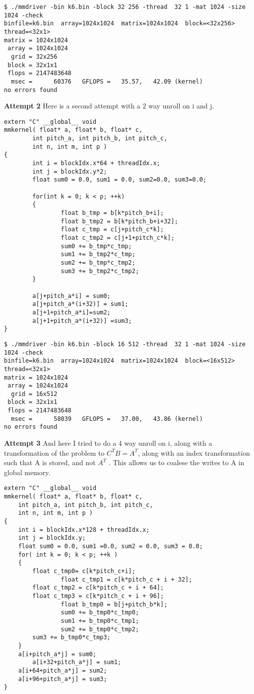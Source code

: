 \documentclass[11pt]{article}
\begin{document}
\begin{enumerate}
\begin{lstlisting}
$ ./mmdriver -bin k6.bin -block 32 256 -thread  32 1 -mat 1024 -size 1024 -check
binfile=k6.bin  array=1024x1024  matrix=1024x1024  block=<32x256>  thread=<32x1>
matrix = 1024x1024
 array = 1024x1024
  grid = 32x256
 block = 32x1x1
 flops = 2147483648
  msec =      60376   GFLOPS =   35.57,   42.09 (kernel)
no errors found
\end{lstlisting}

\textbf{Attempt 2} Here is a second attempt with a 2 way unroll on i and j.

\begin{lstlisting}
extern "C" __global__ void
mmkernel( float* a, float* b, float* c,
        int pitch_a, int pitch_b, int pitch_c,
        int n, int m, int p )
{
        int i = blockIdx.x*64 + threadIdx.x;
        int j = blockIdx.y*2;
        float sum0 = 0.0, sum1 = 0.0, sum2=0.0, sum3=0.0;

        for(int k = 0; k < p; ++k)
        {
                float b_tmp = b[k*pitch_b+i];
                float b_tmp2 = b[k*pitch_b+i+32];
                float c_tmp = c[j+pitch_c*k];
                float c_tmp2 = c[j+1+pitch_c*k];
                sum0 += b_tmp*c_tmp;
                sum1 += b_tmp2*c_tmp;
                sum2 += b_tmp*c_tmp2;
                sum3 += b_tmp2*c_tmp2;
        }

        a[j+pitch_a*i] = sum0;
        a[j+pitch_a*(i+32)] = sum1;
        a[j+1+pitch_a*i]=sum2;
        a[j+1+pitch_a*(i+32)] =sum3;
}
\end{lstlisting}

\begin{lstlisting}
$ ./mmdriver -bin k6.bin -block 16 512 -thread  32 1 -mat 1024 -size 1024 -check
binfile=k6.bin  array=1024x1024  matrix=1024x1024  block=<16x512>  thread=<32x1>
matrix = 1024x1024
 array = 1024x1024
  grid = 16x512
 block = 32x1x1
 flops = 2147483648
  msec =      58039   GFLOPS =   37.00,   43.86 (kernel)
no errors found
\end{lstlisting}

\textbf{Attempt 3} And here I tried to do a 4 way unroll on i, along with a transformation of the problem to $C^TB = A^T$, along with an index transformation such that A is stored, and not $A^T$ . This allows us to coalese the writes to A in global memory.

\begin{lstlisting}
extern "C" __global__ void
mmkernel( float* a, float* b, float* c,
	int pitch_a, int pitch_b, int pitch_c,
	int n, int m, int p )
{
	int i = blockIdx.x*128 + threadIdx.x;
	int j = blockIdx.y;
	float sum0 = 0.0, sum1 =0.0, sum2 = 0.0, sum3 = 0.0;
	for( int k = 0; k < p; ++k )
	{
		float c_tmp0= c[k*pitch_c+i];
                float c_tmp1 = c[k*pitch_c + i + 32];
		float c_tmp2 = c[k*pitch_c + i + 64];
		float c_tmp3 = c[k*pitch_c + i + 96];
                float b_tmp0 = b[j+pitch_b*k];
                sum0 += b_tmp0*c_tmp0;
                sum1 += b_tmp0*c_tmp1;
                sum2 += b_tmp0*c_tmp2;
		sum3 += b_tmp0*c_tmp3;
	}
	a[i+pitch_a*j] = sum0;
        a[i+32+pitch_a*j] = sum1;
	a[i+64+pitch_a*j] = sum2;
	a[i+96+pitch_a*j] = sum3;
}


\end{lstlisting}
\end{enumerate}
\end{document}
